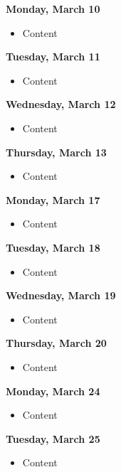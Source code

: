 \documentclass{article}
\begin{document}
\textbf{Monday, March 10}

\begin{itemize}
\item Content
\end{itemize}

\textbf{Tuesday, March 11}

\begin{itemize}
\item Content
\end{itemize}

\textbf{Wednesday, March 12}

\begin{itemize}
\item Content
\end{itemize}

\textbf{Thursday, March 13}

\begin{itemize}
\item Content
\end{itemize}

\textbf{Monday, March 17}

\begin{itemize}
\item Content
\end{itemize}

\textbf{Tuesday, March 18}

\begin{itemize}
\item Content
\end{itemize}

\textbf{Wednesday, March 19}

\begin{itemize}
\item Content
\end{itemize}

\textbf{Thursday, March 20}

\begin{itemize}
\item Content
\end{itemize}

\textbf{Monday, March 24}

\begin{itemize}
\item Content
\end{itemize}

\textbf{Tuesday, March 25}

\begin{itemize}
\item Content
\end{itemize}
\end{document}
